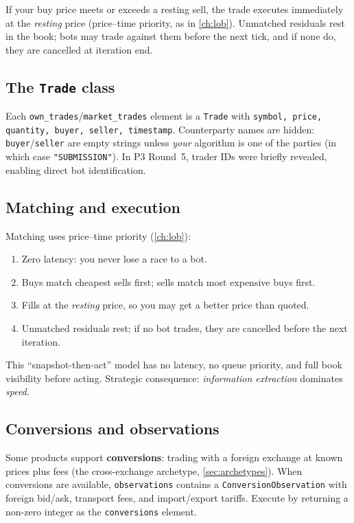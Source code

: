 If your buy price meets or exceeds a resting sell, the trade executes
immediately at the \emph{resting} price (price--time priority, as in
\cref{ch:lob}).  Unmatched residuals rest in the book; bots may trade
against them before the next tick, and if none do, they are cancelled
at iteration end.

\subsection{The \texttt{Trade} class}

Each \texttt{own\_trades}/\texttt{market\_trades} element is a
\texttt{Trade} with \texttt{symbol, price, quantity, buyer, seller,
timestamp}.  Counterparty names are hidden: \texttt{buyer}/\texttt{seller}
are empty strings unless \emph{your} algorithm is one of the parties (in
which case \texttt{"SUBMISSION"}).  In P3 Round~5, trader IDs were
briefly revealed, enabling direct bot identification.

\subsection{Matching and execution}

Matching uses price--time priority (\cref{ch:lob}):
\begin{enumerate}
  \item Zero latency: you never lose a race to a bot.
  \item Buys match cheapest sells first; sells match most expensive buys
  first.
  \item Fills at the \emph{resting} price, so you may get a better price
  than quoted.
  \item Unmatched residuals rest; if no bot trades, they are cancelled
  before the next iteration.
\end{enumerate}

This ``snapshot-then-act'' model has no latency, no queue priority, and
full book visibility before acting.  Strategic consequence:
\emph{information extraction} dominates \emph{speed}.

\subsection{Conversions and observations}

Some products support \textbf{conversions}: trading with a foreign
exchange at known prices plus fees (the cross-exchange archetype,
\cref{sec:archetypes}).  When conversions are available,
\texttt{observations} contains a \texttt{ConversionObservation} with
foreign bid/ask, transport fees, and import/export tariffs.  Execute by
returning a non-zero integer as the \texttt{conversions} element.

